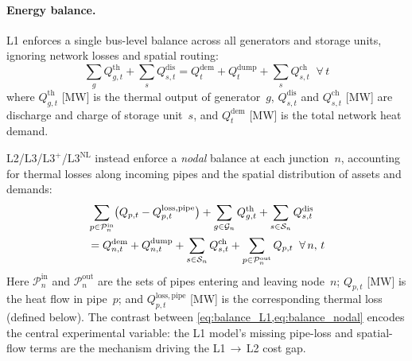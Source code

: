 \documentclass[a4paper,fleqn]{cas-dc}
\newcommand{\Lplus}{\mathrm{L3}^{+}}
\newcommand{\Lnl}{\mathrm{L3}^{\mathrm{NL}}}
\begin{document}
\paragraph{Energy balance.}
L1 enforces a single bus-level balance across all generators and
storage units, ignoring network losses and spatial routing:
%
\begin{equation}
  \sum_{g} Q_{g,t}^{\mathrm{th}}
    + \sum_{s} Q_{s,t}^{\mathrm{dis}}
  = Q_t^{\mathrm{dem}} + Q_t^{\mathrm{dump}}
    + \sum_{s} Q_{s,t}^{\mathrm{ch}}
  \;\; \forall\, t
  \label{eq:balance_L1}
\end{equation}
%
where $Q_{g,t}^{\mathrm{th}}$ [MW] is the thermal output of
generator~$g$, $Q_{s,t}^{\mathrm{dis}}$ and $Q_{s,t}^{\mathrm{ch}}$
[MW] are discharge and charge of storage unit~$s$, and
$Q_t^{\mathrm{dem}}$ [MW] is the total network heat demand.

L2/L3/$\Lplus$/$\Lnl$ instead enforce a \emph{nodal} balance at
each junction~$n$, accounting for thermal losses along incoming
pipes and the spatial distribution of assets and demands:
%
\begin{align}
  &\sum_{p \in \mathcal{P}_n^{\mathrm{in}}}
    \bigl(Q_{p,t} - Q_{p,t}^{\mathrm{loss,pipe}}\bigr)
  + \sum_{g \in \mathcal{G}_n} Q_{g,t}^{\mathrm{th}}
  + \sum_{s \in \mathcal{S}_n} Q_{s,t}^{\mathrm{dis}} \notag \\
  &= Q_{n,t}^{\mathrm{dem}} + Q_{n,t}^{\mathrm{dump}}
  + \sum_{s \in \mathcal{S}_n} Q_{s,t}^{\mathrm{ch}}
  + \sum_{p \in \mathcal{P}_n^{\mathrm{out}}} Q_{p,t}
  \;\; \forall\, n,\, t
  \label{eq:balance_nodal}
\end{align}
%
Here $\mathcal{P}_n^{\mathrm{in}}$ and $\mathcal{P}_n^{\mathrm{out}}$
are the sets of pipes entering and leaving node~$n$;
$Q_{p,t}$ [MW] is the heat flow in pipe~$p$; and
$Q_{p,t}^{\mathrm{loss,pipe}}$ [MW] is the corresponding thermal
loss (defined below). The contrast between
\cref{eq:balance_L1,eq:balance_nodal} encodes the central
experimental variable: the L1 model's missing pipe-loss and
spatial-flow terms are the mechanism driving the L1\,$\to$\,L2
cost gap.
\end{document}

